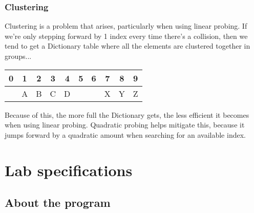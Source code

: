 \documentclass[a4paper,12pt,oneside]{book}
\begin{document}
\subsubsection{Clustering}

Clustering is a problem that arises, particularly when using linear probing.
If we're only stepping forward by 1 index every time there's a collision,
then we tend to get a Dictionary table where all the elements are clustered
together in groups...

\begin{center}
    \begin{tabular}{| c | c | c | c | c | c | c | c | c | c |}
        \hline
        0 & 1 & 2 & 3 & 4 & 5 & 6 & 7 & 8 & 9
        \\ \hline
        & A & B & C & D & & & X & Y & Z
        \\ \hline
    \end{tabular}
\end{center}

Because of this, the more full the Dictionary gets, the less efficient
it becomes when using linear probing. Quadratic probing helps mitigate this,
because it jumps forward by a quadratic amount when searching for an
available index.

\section{Lab specifications}

\subsection{About the program}


        
\end{document}
